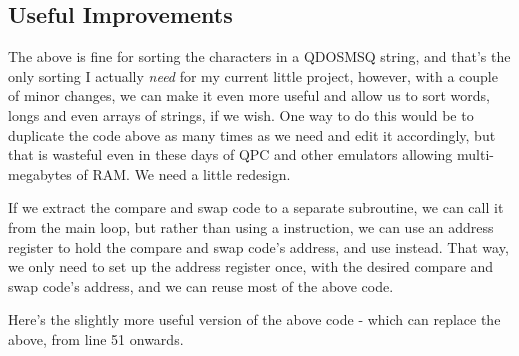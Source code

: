 \subsection{Useful Improvements}

The above is fine for sorting the characters in a QDOSMSQ string, and that's the only sorting I actually \emph{need} for my current little project, however, with a couple of minor changes, we can make it even more useful and allow us to sort words, longs and even arrays of strings, if we wish. One way to do this would be to duplicate the code above as many times as we need and edit it accordingly, but that is wasteful even in these days of QPC and other emulators allowing multi-megabytes of RAM. We need a little redesign.

If we extract the compare and swap code to a separate subroutine, we can call it from the main loop, but rather than using a  instruction, we can use an address register to hold the compare and swap code's address, and use  instead. That way, we only need to set up the address register once, with the desired compare and swap code's address, and we can reuse most of the above code.

Here's the slightly more useful version of the above code - which can replace the above, from line 51 onwards.

